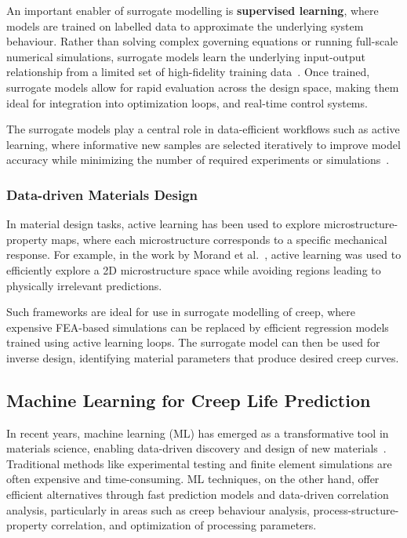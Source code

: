 \documentclass[class=scrbook, crop=false]{standalone}
\begin{document}
An important enabler of surrogate modelling is \textbf{supervised learning}, where models are trained on labelled data to approximate the underlying system behaviour. Rather than solving complex governing equations or running full-scale numerical simulations, surrogate models learn the underlying input-output relationship from a limited set of high-fidelity training data~\cite{bessa2017framework}. Once trained, surrogate models allow for rapid evaluation across the design space, making them ideal for integration into optimization loops, and real-time control systems.

The surrogate models play a central role in data-efficient workflows such as active learning, where informative new samples are selected iteratively to improve model accuracy while minimizing the number of required experiments or simulations~\cite{settles2010active}.

\subsubsection{Data-driven Materials Design}

In material design tasks, active learning has been used to explore microstructure-property maps, where each microstructure corresponds to a specific mechanical response. For example, in the work by Morand et al.~\cite{morand2022efficient}, active learning was used to efficiently explore a 2D microstructure space while avoiding regions leading to physically irrelevant predictions.

Such frameworks are ideal for use in surrogate modelling of creep, where expensive FEA-based simulations can be replaced by efficient regression models trained using active learning loops. The surrogate model can then be used for inverse design, identifying material parameters that produce desired creep curves.


\subsection{Machine Learning for Creep Life Prediction}

In recent years, machine learning (ML) has emerged as a transformative tool in materials science, enabling data-driven discovery and design of new materials~\cite{agrawal2016perspective}. Traditional methods like experimental testing and finite element simulations are often expensive and time-consuming. ML techniques, on the other hand, offer efficient alternatives through fast prediction models and data-driven correlation analysis, particularly in areas such as creep behaviour analysis, process-structure-property correlation, and optimization of processing parameters.
\end{document}
